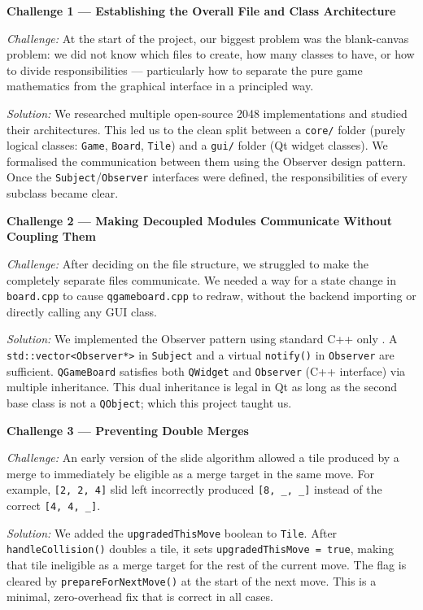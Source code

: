 \documentclass[a4paper,12pt]{article}
\begin{document}
\textbf{Challenge 1 --- Establishing the Overall File and Class Architecture}

\textit{Challenge:} At the start of the project, our biggest problem was the blank-canvas problem: we did not know which files to create, how many classes to have, or how to divide responsibilities --- particularly how to separate the pure game mathematics from the graphical interface in a principled way.

\textit{Solution:} We researched multiple open-source 2048 implementations and studied their architectures. This led us to the clean split between a \texttt{core/} folder (purely logical classes: \texttt{Game}, \texttt{Board}, \texttt{Tile}) and a \texttt{gui/} folder (Qt widget classes). We formalised the communication between them using the Observer design pattern. Once the \texttt{Subject}/\texttt{Observer} interfaces were defined, the responsibilities of every subclass became clear.

\textbf{Challenge 2 --- Making Decoupled Modules Communicate Without Coupling Them}

\textit{Challenge:} After deciding on the file structure, we struggled to make the completely separate files communicate. We needed a way for a state change in \texttt{board.cpp} to cause \texttt{qgameboard.cpp} to redraw, without the backend importing or directly calling any GUI class.

\textit{Solution:} We implemented the Observer pattern using standard C++ only . A \texttt{std::vector<Observer*>} in \texttt{Subject} and a virtual \texttt{notify()} in \texttt{Observer} are sufficient. \texttt{QGameBoard} satisfies both \texttt{QWidget} and \texttt{Observer} (C++ interface) via multiple inheritance. This dual inheritance is legal in Qt as long as the second base class is not a \texttt{QObject}; which this project taught us.

\textbf{Challenge 3 --- Preventing Double Merges}

\textit{Challenge:} An early version of the slide algorithm allowed a tile produced by a merge to immediately be eligible as a merge target in the same move. For example, \texttt{[2, 2, 4]} slid left incorrectly produced \texttt{[8, \_, \_]} instead of the correct \texttt{[4, 4, \_]}.

\textit{Solution:} We added the \texttt{upgradedThisMove} boolean to \texttt{Tile}. After \texttt{handleCollision()} doubles a tile, it sets \texttt{upgradedThisMove = true}, making that tile ineligible as a merge target for the rest of the current move. The flag is cleared by \texttt{prepareForNextMove()} at the start of the next move. This is a minimal, zero-overhead fix that is correct in all cases.
\end{document}
